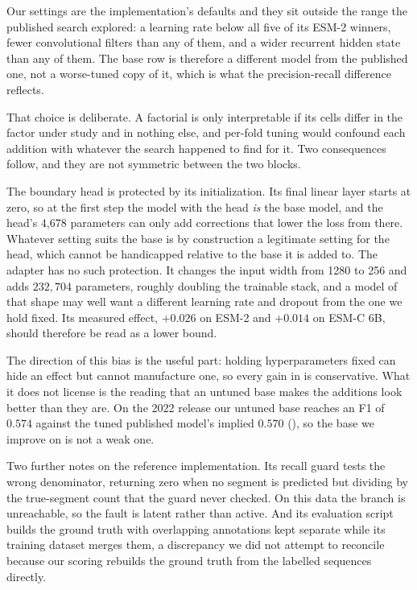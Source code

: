 \documentclass{article}
\begin{document}
Our settings are the implementation's defaults and they sit outside the range the published
search explored: a learning rate below all five of its ESM-2 winners, fewer convolutional filters
than any of them, and a wider recurrent hidden state than any of them. The base row is therefore a
different model from the published one, not a worse-tuned copy of it, which is what the
precision-recall difference reflects.

That choice is deliberate. A factorial is only interpretable if its cells differ in the factor
under study and in nothing else, and per-fold tuning would confound each addition with whatever
the search happened to find for it. Two consequences follow, and they are not symmetric between
the two blocks.

The boundary head is protected by its initialization. Its final linear layer starts at zero, so at
the first step the model with the head \emph{is} the base model, and the head's 4{,}678 parameters
can only add corrections that lower the loss from there. Whatever setting suits the base is by
construction a legitimate setting for the head, which cannot be handicapped relative to the base it
is added to. The adapter has no such protection. It changes the input width from 1280 to 256 and
adds $232{,}704$ parameters, roughly doubling the trainable stack, and a model of that shape may
well want a different learning rate and dropout from the one we hold fixed. Its measured effect,
$+0.026$ on ESM-2 and $+0.014$ on ESM-C 6B, should therefore be read as a lower bound.

The direction of this bias is the useful part: holding hyperparameters fixed can hide an effect but
cannot manufacture one, so every gain in  is conservative. What it does not
license is the reading that an untuned base makes the additions look better than they are. On the
2022 release our untuned base reaches an F1 of $0.574$ against the tuned published model's implied
$0.570$ (), so the base we improve on is not a weak one.

Two further notes on the reference implementation. Its recall guard tests the wrong denominator,
returning zero when no segment is predicted but dividing by the true-segment count that the guard
never checked. On this data the branch is unreachable, so the fault is latent rather than active.
And its evaluation script builds the ground truth with overlapping annotations kept separate while
its training dataset merges them, a discrepancy we did not attempt to reconcile because our
scoring rebuilds the ground truth from the labelled sequences directly.
\end{document}
